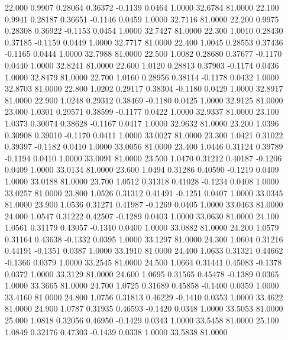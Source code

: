  22.000   0.9907   0.28064   0.36372  -0.1139   0.0464   1.0000  32.6784  81.0000
  22.100   0.9941   0.28187   0.36651  -0.1146   0.0459   1.0000  32.7116  81.0000
  22.200   0.9975   0.28308   0.36922  -0.1153   0.0454   1.0000  32.7427  81.0000
  22.300   1.0010   0.28430   0.37185  -0.1159   0.0449   1.0000  32.7717  81.0000
  22.400   1.0045   0.28553   0.37436  -0.1165   0.0444   1.0000  32.7988  81.0000
  22.500   1.0082   0.28680   0.37677  -0.1170   0.0440   1.0000  32.8241  81.0000
  22.600   1.0120   0.28813   0.37903  -0.1174   0.0436   1.0000  32.8479  81.0000
  22.700   1.0160   0.28956   0.38114  -0.1178   0.0432   1.0000  32.8703  81.0000
  22.800   1.0202   0.29117   0.38304  -0.1180   0.0429   1.0000  32.8917  81.0000
  22.900   1.0248   0.29312   0.38469  -0.1180   0.0425   1.0000  32.9125  81.0000
  23.000   1.0301   0.29571   0.38599  -0.1177   0.0422   1.0000  32.9337  81.0000
  23.100   1.0373   0.30074   0.38628  -0.1167   0.0417   1.0000  32.9632  81.0000
  23.200   1.0396   0.30908   0.39010  -0.1170   0.0411   1.0000  33.0027  81.0000
  23.300   1.0421   0.31022   0.39397  -0.1182   0.0410   1.0000  33.0056  81.0000
  23.400   1.0446   0.31124   0.39789  -0.1194   0.0410   1.0000  33.0091  81.0000
  23.500   1.0470   0.31212   0.40187  -0.1206   0.0409   1.0000  33.0134  81.0000
  23.600   1.0494   0.31286   0.40590  -0.1219   0.0409   1.0000  33.0188  81.0000
  23.700   1.0512   0.31318   0.41028  -0.1234   0.0408   1.0000  33.0257  81.0000
  23.800   1.0526   0.31312   0.41491  -0.1251   0.0407   1.0000  33.0345  81.0000
  23.900   1.0536   0.31271   0.41987  -0.1269   0.0405   1.0000  33.0463  81.0000
  24.000   1.0547   0.31222   0.42507  -0.1289   0.0403   1.0000  33.0630  81.0000
  24.100   1.0561   0.31179   0.43057  -0.1310   0.0400   1.0000  33.0882  81.0000
  24.200   1.0579   0.31164   0.43638  -0.1332   0.0395   1.0000  33.1297  81.0000
  24.300   1.0604   0.31216   0.44191  -0.1351   0.0387   1.0000  33.1910  81.0000
  24.400   1.0633   0.31321   0.44662  -0.1366   0.0379   1.0000  33.2545  81.0000
  24.500   1.0664   0.31441   0.45083  -0.1378   0.0372   1.0000  33.3129  81.0000
  24.600   1.0695   0.31565   0.45478  -0.1389   0.0365   1.0000  33.3665  81.0000
  24.700   1.0725   0.31689   0.45858  -0.1400   0.0359   1.0000  33.4160  81.0000
  24.800   1.0756   0.31813   0.46229  -0.1410   0.0353   1.0000  33.4622  81.0000
  24.900   1.0787   0.31935   0.46593  -0.1420   0.0348   1.0000  33.5053  81.0000
  25.000   1.0818   0.32056   0.46950  -0.1429   0.0343   1.0000  33.5458  81.0000
  25.100   1.0849   0.32176   0.47303  -0.1439   0.0338   1.0000  33.5838  81.0000
